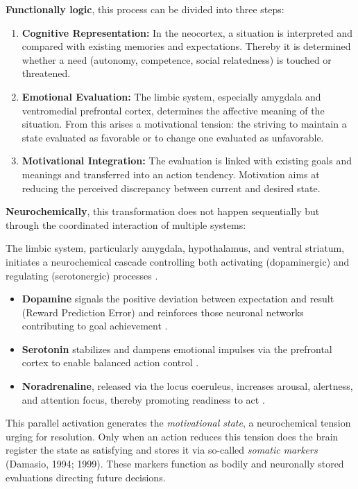 \textbf{Functionally logic}, this process can be divided into three steps:

\begin{enumerate}
    \item \textbf{Cognitive Representation:} In the neocortex, a situation is interpreted and compared with existing memories and expectations.
    Thereby it is determined whether a need (autonomy, competence, social relatedness) is touched or threatened.
    \item \textbf{Emotional Evaluation:} The limbic system, especially amygdala and ventromedial prefrontal cortex, determines the affective meaning of the situation.
    From this arises a motivational tension: the striving to maintain a state evaluated as favorable or to change one evaluated as unfavorable.
    \item \textbf{Motivational Integration:} The evaluation is linked with existing goals and meanings and transferred into an action tendency.
    Motivation aims at reducing the perceived discrepancy between current and desired state.
\end{enumerate}

\textbf{Neurochemically}, this transformation does not happen sequentially but through the coordinated interaction of multiple systems:

The limbic system, particularly amygdala, hypothalamus, and ventral striatum, initiates a neurochemical cascade controlling both activating (dopaminergic) and regulating (serotonergic) processes \cite{LeDoux1996, Panksepp1998, Damasio1999}.
\begin{itemize}
    \item \textbf{Dopamine} signals the positive deviation between expectation and result (Reward Prediction Error) and reinforces those neuronal networks contributing to goal achievement \cite{Schultz1997}.
    \item \textbf{Serotonin} stabilizes and dampens emotional impulses via the prefrontal cortex to enable balanced action control \cite{CarverScheier1998, Cools2008}.
    \item \textbf{Noradrenaline}, released via the locus coeruleus, increases arousal, alertness, and attention focus, thereby promoting readiness to act \cite{AstonJones2005}.
\end{itemize}

This parallel activation generates the \emph{motivational state}, a neurochemical tension urging for resolution.
Only when an action reduces this tension does the brain register the state as satisfying and stores it via so-called \emph{somatic markers} (Damasio, 1994; 1999).
These markers function as bodily and neuronally stored evaluations directing future decisions.

